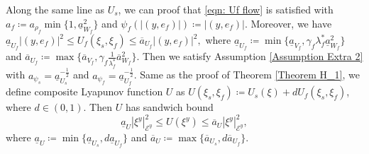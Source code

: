 Along the same line as $U_s$, we can proof that \eqref{eqn: Uf flow} is satisfied with $a_f \! \coloneqq \! a_{\rho_f} \min \{ 1, \underline{a}_{W_f}^2 \}$ and $\psi_f(|(y,e_f)|) \coloneqq |(y,e_f)|$. Moreover, we have $\underline{a}_{U_f}|(y,e_f)|^2 \leq U_f(\xi_s, \xi_f) \leq \overline{a}_{U_f}|(y,e_f)|^2,$ where $\underline{a}_{U_f} \coloneqq \min\{\underline{a}_{V_f}, \gamma_f \lambda_f^* \underline{a}_{W_f}^2 \}$ and $\overline{a}_{U_f} \coloneqq \max\{\overline{a}_{V_f}, \gamma_f \tfrac{1}{\lambda_f^*} \overline{a}_{W_f}^2 \}$. Then we satisfy Assumption \ref{Assumption Extra 2} 
with $a_{\psi_s} = \underline{a}_{U_s}^{-\frac{1}{2}}$ and $a_{\psi_f} = \underline{a}_{U_f}^{-\frac{1}{2}}$.
%
Same as the proof of Theorem \ref{Theorem H_1}, we define composite Lyapunov function $U$ as $U(\xi_s, \xi_f) \coloneqq U_s(\xi) + d U_f(\xi_s,\xi_f)$, where $d \in (0,1)$. Then $U$ has sandwich bound 
\begin{equation}
    \underline{a}_{U} |\xi^y|_{\mathcal{E}^y}^2 \leq U(\xi^y) \leq \overline{a}_{U} |\xi^y|_{\mathcal{E}^y}^2, \label{eqn: Exponential U sandwich bound}
\end{equation}
where $\underline{a}_{U} \coloneqq \min \{\underline{a}_{U_s}, d \underline{a}_{U_f} \}$ and $\overline{a}_{U} \coloneqq \max \{\overline{a}_{U_s}, d \overline{a}_{U_f} \}$. 



